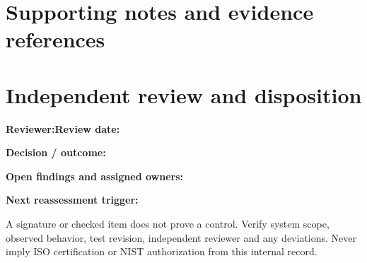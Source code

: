 \documentclass[10pt,letterpaper]{article}
\begin{document}
\section{Supporting notes and evidence references}
\section{Independent review and disposition}
\textbf{Reviewer:}\enspace\hrulefill\quad\textbf{Review date:}\enspace\hrulefill\par\medskip
\textbf{Decision / outcome:}\enspace\hrulefill\par\medskip
\textbf{Open findings and assigned owners:}\enspace\hrulefill\par\medskip
\textbf{Next reassessment trigger:}\enspace\hrulefill\par\medskip
\begin{warnbox}A signature or checked item does not prove a control. Verify system scope, observed behavior, test revision, independent reviewer and any deviations. Never imply ISO certification or NIST authorization from this internal record.\end{warnbox}
\end{document}
